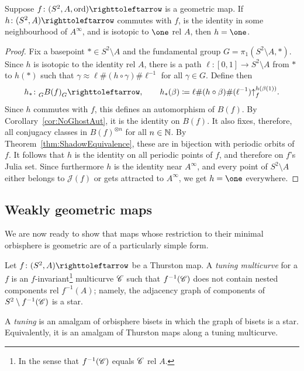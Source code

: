 \documentclass{amsart}
\newcommand\Julia{{\mathcal J}}
\begin{document}
\begin{thm}[Rigidity]\label{thm:rigidity}
  Suppose $f\colon(S^2,A,\ord)\selfmap$ is a geometric map. If
  $h\colon(S^2,A)\selfmap$ commutes with $f$, is the identity in some
  neighbourhood of $A^\infty$, and is isotopic to $\one$ rel $A$, then
  $h=\one$.
\end{thm}
\begin{proof}
  Fix a basepoint $*\in S^2\setminus A$ and the fundamental group
  $G=\pi_1(S^2\setminus A,*)$.  Since $h$ is isotopic to the identity
  rel $A$, there is a path $\ell\colon[0,1]\to S^2\setminus A$ from
  $*$ to $h(*)$ such that
  $\gamma\approx\ell\#(h\circ\gamma)\#\ell^{-1}$ for all
  $\gamma\in G$. Define then
  \[h_*\colon\subscript G{B(f)}_G\selfmap,\qquad
    h_*(\beta)\coloneqq\ell\#(h\circ\beta)\#(\ell^{-1})\lift f{h(\beta(1))}.
  \]
  Since $h$ commutes with $f$, this defines an automorphism of
  $B(f)$. By Corollary~\ref{cor:NoGhostAut}, it is the identity on
  $B(f)$. It also fixes, therefore, all conjugacy classes in
  $B(f)^{\otimes n}$ for all $n\in{\mathbb N}$. By
  Theorem~\ref{thm:ShadowEquivalence}, these are in bijection with
  periodic orbits of $f$. It follows that $h$ is the identity on all
  periodic points of $f$, and therefore on $f$'s Julia set. Since
  furthermore $h$ is the identity near $A^\infty$, and every point of
  $S^2\setminus A$ either belongs to $\Julia(f)$ or gets attracted to
  $A^\infty$, we get $h=\one$ everywhere.
\end{proof}

\subsection{Weakly geometric maps}
We are now ready to show that maps whose restriction to their minimal
orbisphere is geometric are of a particularly simple form.

\begin{defn}[Tunings]
  Let $f\colon(S^2,A)\selfmap$ be a Thurston map.  A \emph{tuning
    multicurve} for a $f$ is an $f$-invariant\footnote{In the sense
    that $f^{-1}({\mathscr C})$ equals ${\mathscr C}$ rel $A$.}  multicurve ${\mathscr C}$ such
  that $f^{-1}({\mathscr C})$ does not contain nested components rel
  $f^{-1}(A)$; namely, the adjacency graph of components of
  $S^2\setminus f^{-1}({\mathscr C})$ is a star.

  A \emph{tuning} is an amalgam of orbisphere bisets in which the
  graph of bisets is a star. Equivalently, it is an amalgam of
  Thurston maps along a tuning multicurve.
\end{defn}
\end{document}

